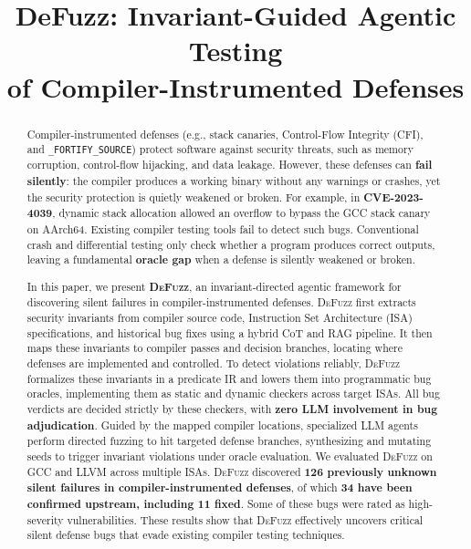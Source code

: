 \documentclass[conference]{IEEEtran}
\begin{document}
\title{DeFuzz: Invariant-Guided Agentic Testing\\of Compiler-Instrumented Defenses}

\author{\IEEEauthorblockN{\mbox{}}\IEEEauthorblockA{\mbox{}}}

\maketitle
\thispagestyle{plain}
\pagestyle{plain}

\begin{abstract}
Compiler-instrumented defenses (e.g., stack canaries, Control-Flow Integrity (CFI), and \texttt{\_FORTIFY\_SOURCE}) protect software against security threats, such as memory corruption, control-flow hijacking, and data leakage. However, these defenses can \textbf{fail silently}: the compiler produces a working binary without any warnings or crashes, yet the security protection is quietly weakened or broken. For example, in \textbf{CVE-2023-4039}, dynamic stack allocation allowed an overflow to bypass the GCC stack canary on AArch64. Existing compiler testing tools fail to detect such bugs. Conventional crash and differential testing only check whether a program produces correct outputs, leaving a fundamental \textbf{oracle gap} when a defense is silently weakened or broken.

In this paper, we present \textbf{\textsc{DeFuzz}}, an invariant-directed agentic framework for discovering silent failures in compiler-instrumented defenses. \textsc{DeFuzz} first extracts security invariants from compiler source code, Instruction Set Architecture (ISA) specifications, and historical bug fixes using a hybrid CoT and RAG pipeline. It then maps these invariants to compiler passes and decision branches, locating where defenses are implemented and controlled. To detect violations reliably, \textsc{DeFuzz} formalizes these invariants in a predicate IR and lowers them into programmatic bug oracles, implementing them as static and dynamic checkers across target ISAs. All bug verdicts are decided strictly by these checkers, with \textbf{zero LLM involvement in bug adjudication}. Guided by the mapped compiler locations, specialized LLM agents perform directed fuzzing to hit targeted defense branches, synthesizing and mutating seeds to trigger invariant violations under oracle evaluation. We evaluated \textsc{DeFuzz} on GCC and LLVM across multiple ISAs. \textsc{DeFuzz} discovered \textbf{126 previously unknown silent failures in compiler-instrumented defenses}, of which \textbf{34 have been confirmed upstream, including 11 fixed}. Some of these bugs were rated as high-severity vulnerabilities. These results show that \textsc{DeFuzz} effectively uncovers critical silent defense bugs that evade existing compiler testing techniques.
\end{abstract}
\end{document}
